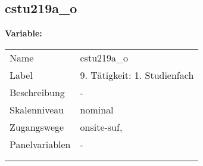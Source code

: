 	
	
	\subsection{cstu219a\_o}
	\label{subSection:cstu219a_o}

	\noindent\textbf{Variable:}\\
		\begin{tabular}{lL{11.3cm}}
			\label{tableVariable:cstu219a_o}
			Name & cstu219a\_o \\
			Label & 9. Tätigkeit: 1. Studienfach \\
			Beschreibung & - \\
			Skalenniveau & nominal \\
			Zugangswege &
				onsite-suf,
 \\
			Panelvariablen & -
			 \\
			 \\
 \\
		\end{tabular}






